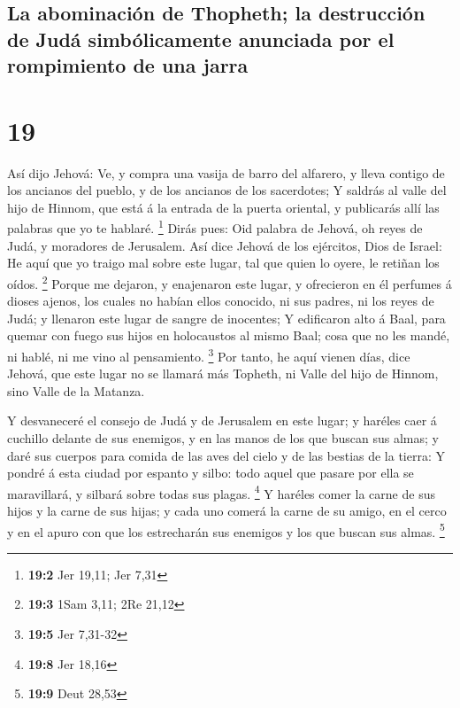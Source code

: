 \hypertarget{la-abominaciuxf3n-de-thopheth-la-destrucciuxf3n-de-juduxe1-simbuxf3licamente-anunciada-por-el-rompimiento-de-una-jarra}{%
\subsection{La abominación de Thopheth; la destrucción de Judá
simbólicamente anunciada por el rompimiento de una
jarra}\label{la-abominaciuxf3n-de-thopheth-la-destrucciuxf3n-de-juduxe1-simbuxf3licamente-anunciada-por-el-rompimiento-de-una-jarra}}

\hypertarget{section-18}{%
\section{19}\label{section-18}}

 Así dijo Jehová: Ve, y compra una vasija de barro del
alfarero, y lleva contigo de los ancianos del pueblo, y de los ancianos
de los sacerdotes;  Y saldrás al valle del hijo de Hinnom,
que está á la entrada de la puerta oriental, y publicarás allí las
palabras que yo te hablaré. \footnote{\textbf{19:2} Jer 19,11; Jer 7,31}
 Dirás pues: Oid palabra de Jehová, oh reyes de Judá, y
moradores de Jerusalem. Así dice Jehová de los ejércitos, Dios de
Israel: He aquí que yo traigo mal sobre este lugar, tal que quien lo
oyere, le retiñan los oídos. \footnote{\textbf{19:3} 1Sam 3,11; 2Re
  21,12}  Porque me dejaron, y enajenaron este lugar, y
ofrecieron en él perfumes á dioses ajenos, los cuales no habían ellos
conocido, ni sus padres, ni los reyes de Judá; y llenaron este lugar de
sangre de inocentes;  Y edificaron alto á Baal, para
quemar con fuego sus hijos en holocaustos al mismo Baal; cosa que no les
mandé, ni hablé, ni me vino al pensamiento. \footnote{\textbf{19:5} Jer
  7,31-32}  Por tanto, he aquí vienen días, dice Jehová,
que este lugar no se llamará más Topheth, ni Valle del hijo de Hinnom,
sino Valle de la Matanza.

 Y desvaneceré el consejo de Judá y de Jerusalem en este
lugar; y haréles caer á cuchillo delante de sus enemigos, y en las manos
de los que buscan sus almas; y daré sus cuerpos para comida de las aves
del cielo y de las bestias de la tierra:  Y pondré á esta
ciudad por espanto y silbo: todo aquel que pasare por ella se
maravillará, y silbará sobre todas sus plagas. \footnote{\textbf{19:8}
  Jer 18,16}  Y haréles comer la carne de sus hijos y la
carne de sus hijas; y cada uno comerá la carne de su amigo, en el cerco
y en el apuro con que los estrecharán sus enemigos y los que buscan sus
almas. \footnote{\textbf{19:9} Deut 28,53}


